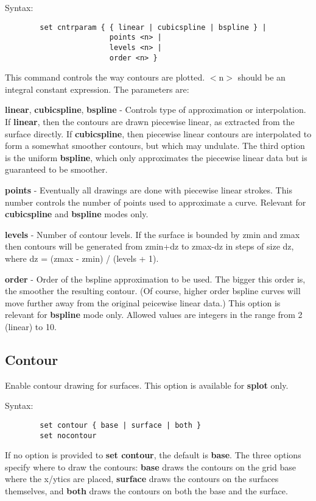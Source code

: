 Syntax:
\begin{verbatim}
        set cntrparam { { linear | cubicspline | bspline } |
                        points <n> |
                        levels <n> |
                        order <n> }
\end{verbatim}

This command controls the way contours are plotted. $<$n$>$ should be an
integral constant expression. The parameters are:

{\bf linear}, {\bf cubicspline}, {\bf bspline} - Controls type of approximation or
interpolation. If {\bf linear}, then the contours are drawn piecewise
linear, as extracted from the surface directly. If {\bf cubicspline}, then
piecewise linear contours are interpolated to form a somewhat smoother
contours, but which may undulate. The third option is the uniform
{\bf bspline}, which only approximates the piecewise linear data but is
guaranteed to be smoother.

{\bf points} - Eventually all drawings are done with piecewise linear
strokes.  This number controls the number of points used to
approximate a curve.  Relevant for {\bf cubicspline} and {\bf bspline} modes
only.

{\bf levels} - Number of contour levels. If the surface is bounded by zmin
and zmax then contours will be generated from zmin+dz to zmax-dz
in steps of size dz, where dz = (zmax - zmin) / (levels + 1).

{\bf order}  - Order of the bspline approximation to be used. The bigger this
order is, the smoother the resulting contour.  (Of course, higher order
bspline curves will move further away from the original peicewise linear
data.)  This option is relevant for {\bf bspline} mode only. Allowed values are 
integers in the range from 2 (linear) to 10.
\subsection{Contour}
Enable contour drawing for surfaces. This option is available for {\bf splot}
only.

Syntax:
\begin{verbatim}
        set contour { base | surface | both }
        set nocontour
\end{verbatim}

If no option is provided to {\bf set contour}, the default is {\bf base}.
The three options specify where to draw the contours: {\bf base} draws
the contours on the grid base where the x/ytics are placed, {\bf surface}
draws the contours on the surfaces themselves, and {\bf both} draws the
contours on both the base and the surface.

